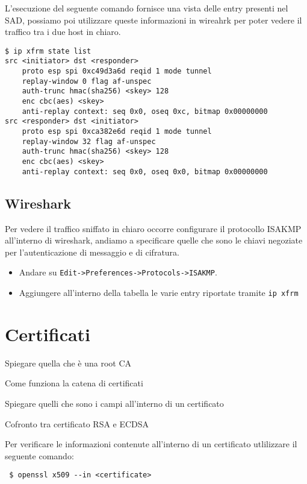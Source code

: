 \documentclass[
10pt, %
a4paper, %
oneside, %
headinclude,footinclude, %
BCOR5mm, %
]{scrartcl}
\begin{document}
\noindent
L'esecuzione del seguente comando fornisce una vista delle entry presenti nel SAD, possiamo poi utilizzare queste informazioni in wireahrk
per poter vedere il traffico tra i due host in chiaro.
\vspace*{0.2cm}
\begin{lstlisting}
$ ip xfrm state list
src <initiator> dst <responder>
    proto esp spi 0xc49d3a6d reqid 1 mode tunnel
    replay-window 0 flag af-unspec
    auth-trunc hmac(sha256) <skey> 128
    enc cbc(aes) <skey>
    anti-replay context: seq 0x0, oseq 0xc, bitmap 0x00000000
src <responder> dst <initiator>
    proto esp spi 0xca382e6d reqid 1 mode tunnel
    replay-window 32 flag af-unspec
    auth-trunc hmac(sha256) <skey> 128
    enc cbc(aes) <skey>
    anti-replay context: seq 0x0, oseq 0x0, bitmap 0x00000000
\end{lstlisting}

\subsection*{Wireshark}
Per vedere il traffico sniffato in chiaro occorre configurare il protocollo ISAKMP all'interno di wireshark, andiamo a specificare quelle che sono
le chiavi negoziate per l'autenticazione di messaggio e di cifratura.

\begin{itemize}
    \item Andare su \lstinline|Edit->Preferences->Protocols->ISAKMP|.
    \item Aggiungere all'interno della tabella le varie entry riportate tramite \lstinline|ip xfrm|
\end{itemize}

\section{Certificati}

Spiegare quella che è una root CA

Come funziona la catena di certificati

Spiegare quelli che sono i campi all'interno di un certificato

Cofronto tra certificato RSA e ECDSA

Per verificare le informazioni contenute all'interno di un certificato utlilizzare il seguente comando:

\begin{lstlisting}
 $ openssl x509 --in <certificate>
\end{lstlisting}


\renewcommand{\refname}{\spacedlowsmallcaps{References}} %



\end{document}
